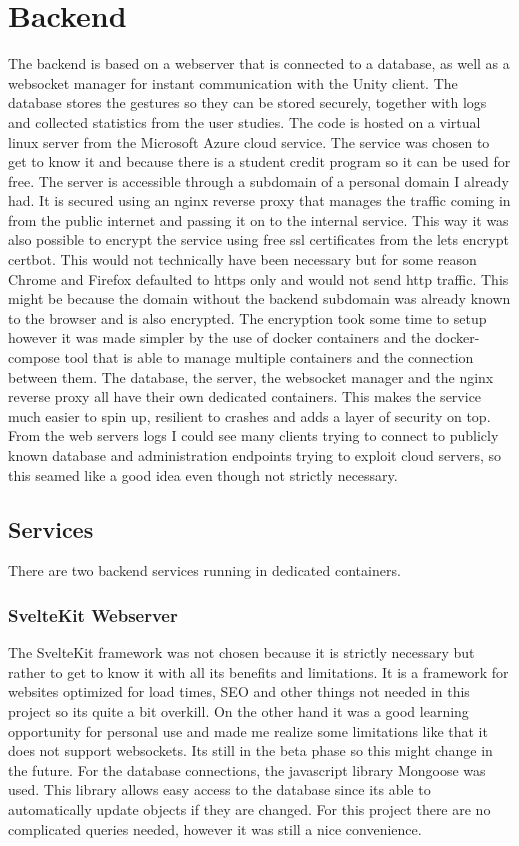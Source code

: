 
\chapter{Backend}
The backend is based on a webserver that is connected to a database, as well as a websocket manager for instant communication with the Unity client. The database stores the gestures so they can be stored securely, together with logs and collected statistics from the user studies. The code is hosted on a virtual linux server from the Microsoft Azure cloud service. The service was chosen to get to know it and because there is a student credit program so it can be used for free. The server is accessible through a subdomain of a personal domain I already had. It is secured using an nginx reverse proxy that manages the traffic coming in from the public internet and passing it on to the internal service. This way it was also possible to encrypt the service using free ssl certificates from the lets encrypt certbot. This would not technically have been necessary but for some reason Chrome and Firefox defaulted to https only and would not send http traffic. This might be because the domain without the backend subdomain was already known to the browser and is also encrypted. The encryption took some time to setup however it was made simpler by the use of docker containers and the docker-compose tool that is able to manage multiple containers and the connection between them. The database, the server, the websocket manager and the nginx reverse proxy all have their own dedicated containers. This makes the service much easier to spin up, resilient to crashes and adds a layer of security on top. From the web servers logs I could see many clients trying to connect to publicly known database and administration endpoints trying to exploit cloud servers, so this seamed like a good idea even though not strictly necessary. 

\section{Services}
There are two backend services running in dedicated containers.

\subsection{SvelteKit Webserver}
The SvelteKit framework was not chosen because it is strictly necessary but rather to get to know it with all its benefits and limitations. It is a framework for websites optimized for load times, SEO and other things not needed in this project so its quite a bit overkill. On the other hand it was a good learning opportunity for personal use and made me realize some limitations like that it does not support websockets. Its still in the beta phase so this might change in the future. For the database connections, the javascript library Mongoose was used. This library allows easy access to the database since its able to automatically update objects if they are changed. For this project there are no complicated queries needed, however it was still a nice convenience. 

